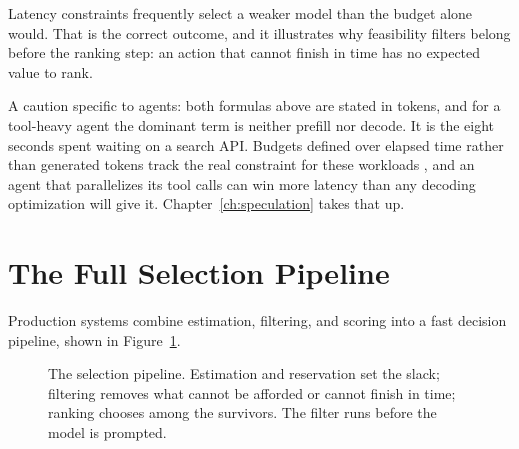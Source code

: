 \documentclass[11pt]{book}
\begin{document}
Latency constraints frequently select a weaker model than the budget alone would. That is the correct outcome, and it illustrates why feasibility filters belong before the ranking step: an action that cannot finish in time has no expected value to rank.

A caution specific to agents: both formulas above are stated in tokens, and for a tool-heavy agent the dominant term is neither prefill nor decode. It is the eight seconds spent waiting on a search API. Budgets defined over elapsed time rather than generated tokens track the real constraint for these workloads \cite{timelymachine2026}, and an agent that parallelizes its tool calls can win more latency than any decoding optimization will give it. Chapter~\ref{ch:speculation} takes that up.

\section{The Full Selection Pipeline}

Production systems combine estimation, filtering, and scoring into a fast decision pipeline, shown in Figure~\ref{fig:selection-pipeline}.

\begin{figure}[htbp]
\centering
{}
\caption{The selection pipeline. Estimation and reservation set the slack; filtering removes what cannot be afforded or cannot finish in time; ranking chooses among the survivors. The filter runs before the model is prompted.}
\label{fig:selection-pipeline}
\end{figure}
\end{document}
